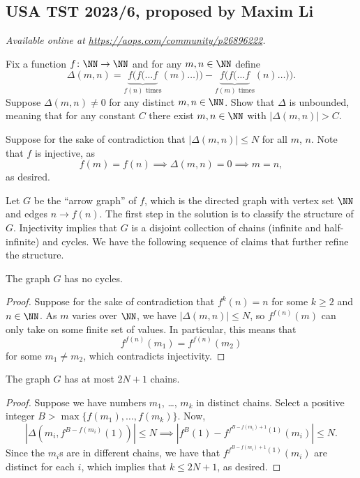 \documentclass[11pt]{scrartcl}
\begin{document}
\subsection{USA TST 2023/6, proposed by Maxim Li}
\textsl{Available online at \url{https://aops.com/community/p26896222}.}
\begin{mdframed}[style=mdpurplebox,frametitle={Problem statement}]
Fix a function $f \colon \NN \to \NN$ and for any $m,n \in \NN$ define
\[
  \Delta(m,n) =
  \underbrace{f(f(\dots f}_{f(n)\text{ times}} (m)\dots)) %
  - \underbrace{f(f(\dots f}_{f(m)\text{ times}} (n)\dots)) %
  .
\]
Suppose $\Delta(m,n) \neq 0$ for any distinct $m,n \in \NN$.
Show that $\Delta$ is unbounded, meaning that for any constant $C$
there exist $m,n \in \NN$
with $\left\lvert \Delta(m,n) \right\rvert > C$.
\end{mdframed}
Suppose for the sake of contradiction that
$|\Delta(m,n)|\le N$ for all $m$, $n$.
Note that $f$ is injective, as
\[f(m)=f(n)\implies\Delta(m,n)=0\implies m=n,\]
as desired.

Let $G$ be the ``arrow graph'' of $f$,
which is the directed graph with vertex set $\NN$ and edges $n\to f(n)$.
The first step in the solution is to classify the structure of $G$.
Injectivity implies that $G$ is a disjoint collection of chains
(infinite and half-infinite) and cycles.
We have the following sequence of claims that further refine the structure.

\begin{claim*}
  The graph $G$ has no cycles.
\end{claim*}
\begin{proof}
  Suppose for the sake of contradiction that $f^k(n)=n$
  for some $k\ge 2$ and $n\in\NN$.
  As $m$ varies over $\NN$, we have $|\Delta(m,n)|\le N$,
  so $f^{f(n)}(m)$ can only take on some finite set of values.
  In particular, this means that
  \[f^{f(n)}(m_1)=f^{f(n)}(m_2)\]
  for some $m_1\ne m_2$, which contradicts injectivity.
\end{proof}
\begin{claim*}
  The graph $G$ has at most $2N+1$ chains.
\end{claim*}
\begin{proof}
  Suppose we have numbers $m_1$, \dots, $m_k$ in distinct chains.
  Select a positive integer $B > \max\{f(m_1), \dots,f(m_k)\}$.
  Now,
  \[ \left|\Delta\left(m_i,f^{B-f(m_i)}(1)\right)\right|\le N
    \implies \left|f^B(1)-f^{f^{B-f(m_i)+1}(1)}(m_i)\right|\le N.\]
  Since the $m_i$s are in different chains,
  we have that $f^{f^{B-f(m_i)+1}(1)}(m_i)$ are distinct for each $i$,
  which implies that $k\le 2N+1$, as desired.
\end{proof}
\end{document}
